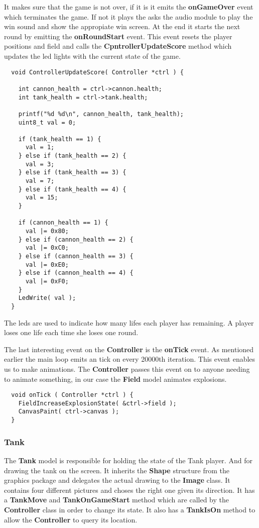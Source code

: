 It makes sure that the game is not over, if it is it emits the {\bf onGameOver} event which
terminates the game. If not it plays the asks the audio module to play the win sound and show the
appropiate win screen. At the end it starts the next round by emitting the {\bf onRoundStart} event.
This event resets the player positions and field and calls the {\bf CpntrollerUpdateScore} method
which updates the led lights with the current state of the game.
\begin{lstlisting}
  void ControllerUpdateScore( Controller *ctrl ) {

    int cannon_health = ctrl->cannon.health;
    int tank_health = ctrl->tank.health;

    printf("%d %d\n", cannon_health, tank_health);
    uint8_t val = 0;

    if (tank_health == 1) {
      val = 1;
    } else if (tank_health == 2) {
      val = 3;
    } else if (tank_health == 3) {
      val = 7;
    } else if (tank_health == 4) {
      val = 15;
    }

    if (cannon_health == 1) {
      val |= 0x80;
    } else if (cannon_health == 2) {
      val |= 0xC0;
    } else if (cannon_health == 3) {
      val |= 0xE0;
    } else if (cannon_health == 4) {
      val |= 0xF0;
    }
    LedWrite( val );
  }
\end{lstlisting}
The leds are used to indicate how many lifes each player has remaining. A player loses one life each
time she loses one round.

The last interesting event on the {\bf Controller} is the {\bf onTick} event. As mentioned earlier
the main loop emits an tick on every 20000th iteration. This event enables us to make animations.
The {\bf Controller} passes this event on to anyone needing to animate something, in our case the
{\bf Field} model animates explosions.
\begin{lstlisting}
  void onTick ( Controller *ctrl ) {
    FieldIncreaseExplosionState( &ctrl->field );
    CanvasPaint( ctrl->canvas );
  }
\end{lstlisting}


\subsubsection{Tank}
The {\bf Tank} model is responsible for holding the state of the Tank player. And for drawing the
tank on the screen. It inherits the {\bf Shape} structure from the graphics package and delegates
the actual drawing to the {\bf Image} class. It contains four different pictures and choses the
right one given its direction. It has a {\bf TankMove} and {\bf TankOnGameStart} method which are
called by the {\bf Controller} class in order to change its state. It also has a {\bf TankIsOn}
method to allow the {\bf Controller} to query its location.

